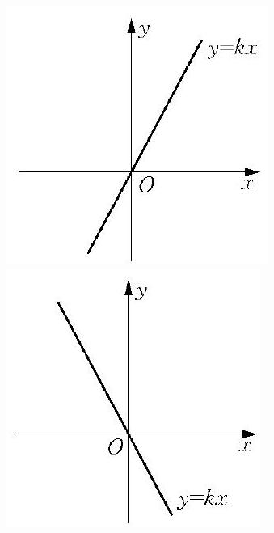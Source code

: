 \documentclass[10pt]{article}
\begin{document}
\includegraphics[max width=\textwidth, center]{2024_10_30_1bf34f7aeb61f11d11d3g-010(2)}\\
\includegraphics[max width=\textwidth, center]{2024_10_30_1bf34f7aeb61f11d11d3g-010}
\end{document}
